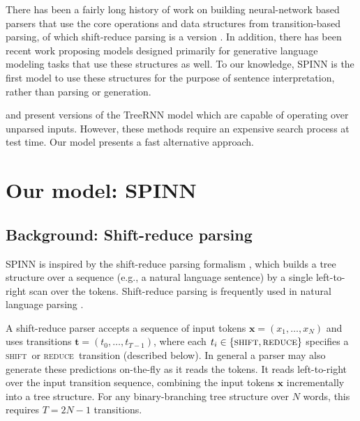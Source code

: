 \documentclass[11pt]{article}
\newcommand{\shift}{\textsc{shift}}
\newcommand{\reduce}{\textsc{reduce}}
\begin{document}
There has been a fairly long history of work on building neural-network based parsers that use the core operations and data structures from transition-based parsing, of which shift-reduce parsing is a version \citep{henderson2004discriminative,emami2005neural,titov2010latent,chen2014,buys2generative,dyer-EtAl:2015:ACL-IJCNLP,kiperwasser2016easy}. In addition, there has been recent work \citep{zhang2016top,dyer2016rnn} proposing models designed primarily for generative language modeling tasks that use these structures as well. To our knowledge, SPINN is the first model to use these structures for the purpose of sentence interpretation, rather than parsing or generation.

\citet{socher2011semi} and \citet{socher2011parsing} present versions of the TreeRNN model which are capable of operating over unparsed inputs. However, these methods require an expensive search process at test time. Our model presents a fast alternative approach.

\section{Our model: SPINN}

\subsection{Background: Shift-reduce parsing}

SPINN is inspired by the shift-reduce parsing formalism \citep{aho1972theory}, which builds a tree structure over a sequence (e.g., a natural language sentence) by a single left-to-right scan over the tokens. Shift-reduce parsing is frequently used in natural language parsing \citep[e.g.,][]{nivre2003efficient}.

A shift-reduce parser accepts a sequence of input tokens $\mathbf x = (x_1, \dots, x_N)$ and uses transitions $\mathbf t = (t_0, \dots, t_{T-1})$, where each $t_i \in \{\shift, \reduce\}$ specifies a \shift~or \reduce~transition (described below). In general a parser may also generate these predictions on-the-fly as it reads the tokens. It reads left-to-right over the input transition sequence, combining the input tokens $\mathbf x$ incrementally into a tree structure. For any binary-branching tree structure over $N$ words, this requires $T = 2N - 1$ transitions.
\end{document}
